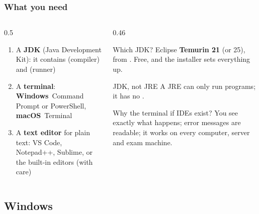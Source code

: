 \documentclass[aspectratio=169,10pt,compress]{beamer}
\newcommand{\win}{\textbf{Windows}}
\newcommand{\mac}{\textbf{macOS}}
\begin{document}
\begin{frame}[t,fragile] \frametitle{What you need}
  \begin{columns}[T]
    \begin{column}{0.5\textwidth}
      \begin{enumerate}
        \item A \textbf{JDK} (Java Development Kit): it contains  (compiler) and  (runner)
        \item A \textbf{terminal}: \win\ Command Prompt or PowerShell, \mac\ Terminal
        \item A \textbf{text editor} for plain text: VS Code, Notepad++, Sublime, or the built-in editors (with care)
      \end{enumerate}
    \end{column}
    \begin{column}{0.46\textwidth}
      \begin{block}{Which JDK?}
        \small Eclipse \textbf{Temurin 21} (or 25), from . Free, and the installer sets everything up.
      \end{block}
      \begin{alertblock}{JDK, not JRE}
        \small A JRE can only run programs; it has no .
      \end{alertblock}
      \begin{block}{Why the terminal if IDEs exist?}
        \small You see exactly what happens; error messages are readable; it works on every computer, server and exam machine.
      \end{block}
    \end{column}
  \end{columns}
\end{frame}

\subsection[Windows]{Windows}
\end{document}
